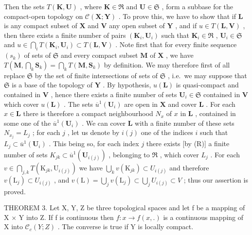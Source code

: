 Then the sets \(T(\mathbf{K}, \mathbf{U})\) , where \(\mathbf{K} \in \mathfrak{R}\) and \(\mathbf{U} \in \mathfrak{S}\) , form a subbase for the compact-open topology on \(\mathcal{C}(\mathbf{X}; \mathbf{Y})\) . To prove this, we have to show that if \(\mathbf{L}\) is any compact subset of \(\mathbf{X}\) and \(\mathbf{V}\) any open subset of \(\mathbf{Y}\) , and if \(u \in T(\mathbf{L}, \mathbf{V})\) , then there exists a finite number of pairs \((\mathbf{K}_i, \mathbf{U}_i)\) such that \(\mathbf{K}_i \in \mathfrak{R}\) , \(\mathbf{U}_i \in \mathfrak{S}\) and \(u \in \bigcap_{i} T(\mathbf{K}_i, \mathbf{U}_i) \subset T(\mathbf{L}, \mathbf{V})\) . Note first that for every finite sequence \((s_k)\) of sets of \(\mathfrak{S}\) and every compact subset \(\mathbf{M}\) of \(\mathbf{X}\) , we have \(T\left(\mathbf{M}, \bigcap_k \mathbf{S}_k\right) = \bigcap_k T(\mathbf{M}, \mathbf{S}_k)\) by definition. We may therefore first of all replace \(\mathfrak{S}\) by the set of finite intersections of sets of \(\mathfrak{S}\) , i.e.~we may suppose that \(\mathfrak{S}\) is a base of the topology of \(\mathbf{Y}\) . By hypothesis, \(u(\mathbf{L})\) is quasi-compact and contained in \(\mathbf{V}\) , hence there exists a finite number of sets \(\mathbf{U}_i \in \mathfrak{S}\) contained in \(\mathbf{V}\) which cover \(u(\mathbf{L})\) . The sets \(\overline{u}^1(\mathbf{U}_i)\) are open in \(\mathbf{X}\) and cover \(\mathbf{L}\) . For each \(x \in \mathbf{L}\) there is therefore a compact neighbourhood \(N_x\) of \(x\) in \(\mathbf{L}\) , contained in some one of the \(\overline{u}^1(\mathbf{U}_i)\) . We can cover \(\mathbf{L}\) with a finite number of these sets \(N_{x_j} = L_j\) ; for each \(j\) , let us denote by \(i(j)\) one of the indices \(i\) such that \(L_j \subset \overline{u}^1(\mathbf{U}_i)\) . This being so, for each index \(j\) there exists {[}by (R){]} a finite number of sets \(K_{jk} \subset \overline{u}^1(\mathbf{U}_{i(j)})\) , belonging to \(\mathfrak{R}\) , which cover \(L_j\) . For each \(v \in \bigcap_{j,k} T(\mathrm{K}_{jk}, \mathrm{U}_{i(j)})\) we have \(\bigcup_{k} v(\mathrm{K}_{jk}) \subset U_{i(j)}\) and therefore \(v(\mathrm{L}_j) \subset U_{i(j)}\) , and \(v(\mathrm{L}) = \bigcup_{j} v(\mathrm{L}_j) \subset \bigcup_{j} U_{i(j)} \subset V\) ; thus our assertion is proved.

THEOREM 3. Let X, Y, Z be three topological spaces and let f be a mapping of X × Y into Z. If f is continuous then \(f: x \to f(x, .)\) is a continuous mapping of X into \(\mathcal{C}_{c}(Y; Z)\) . The converse is true if Y is locally compact.

